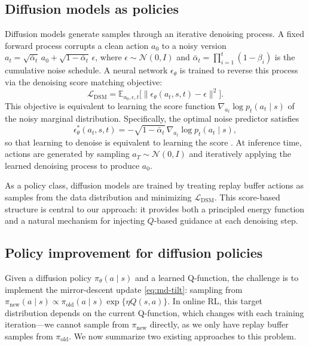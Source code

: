 \documentclass{article}
\theoremstyle{plain}
\theoremstyle{definition}
\theoremstyle{remark}
\newcommand{\E}{\mathbb{E}}
\begin{document}
\subsection{Diffusion models as policies}
\label{sec:diffusion-background}

Diffusion models \citep{ho2020denoising,song2021sde} generate samples through an iterative denoising process.
A fixed forward process corrupts a clean action $a_0$ to a noisy version $a_t = \sqrt{\bar{\alpha}_t}\, a_0 + \sqrt{1-\bar{\alpha}_t}\, \epsilon$, where $\epsilon \sim \mathcal{N}(0,I)$ and $\bar{\alpha}_t = \prod_{i=1}^t (1-\beta_i)$ is the cumulative noise schedule.
A neural network $\epsilon_\theta$ is trained to reverse this process via the denoising score matching objective:
\begin{equation}
  \mathcal{L}_{\text{DSM}} = \E_{a_0, \epsilon, t}\bigl[\|\epsilon_\theta(a_t, s, t) - \epsilon\|^2\bigr].
  \label{eq:dsm}
\end{equation}
This objective is equivalent to learning the score function $\nabla_{a_t} \log p_t(a_t \mid s)$ of the noisy marginal distribution.
Specifically, the optimal noise predictor satisfies
\begin{equation}
  \epsilon_\theta^*(a_t, s, t) = -\sqrt{1-\bar{\alpha}_t}\, \nabla_{a_t} \log p_t(a_t \mid s),
  \label{eq:score-noise}
\end{equation}
so that learning to denoise is equivalent to learning the score \citep{ho2020denoising}.
At inference time, actions are generated by sampling $a_T \sim \mathcal{N}(0,I)$ and iteratively applying the learned denoising process to produce $a_0$.

As a policy class, diffusion models are trained by treating replay buffer actions as samples from the data distribution and minimizing $\mathcal{L}_{\text{DSM}}$.
This score-based structure is central to our approach: it provides both a principled energy function and a natural mechanism for injecting $Q$-based guidance at each denoising step.

\subsection{Policy improvement for diffusion policies}
\label{sec:policy-improvement-bg}

Given a diffusion policy $\pi_\theta(a \mid s)$ and a learned Q-function, the challenge is to implement the mirror-descent update \cref{eq:md-tilt}: sampling from $\pi_{\mathrm{new}}(a\mid s) \propto \pi_\mathrm{old}(a\mid s) \exp\{\eta Q(s,a)\}$.
In online RL, this target distribution depends on the current Q-function, which changes with each training iteration---we cannot sample from $\pi_{\mathrm{new}}$ directly, as we only have replay buffer samples from $\pi_{\mathrm{old}}$.
We now summarize two existing approaches to this problem.
\end{document}
